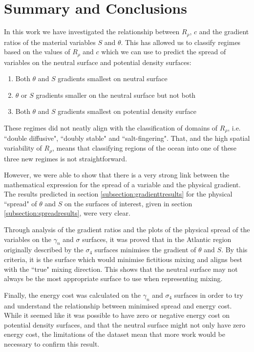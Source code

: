 \label{chapter:Discussion}
\section{Summary and Conclusions}

In this work we have investigated the relationship between $R_\rho$, $c$ and the gradient ratios of the material variables $S$ and $\theta$. This has allowed us to classify regimes based on the values of $R_\rho$ and $c$ which we can use to predict the spread of variables on the neutral surface and potential density surfaces:

\begin{enumerate}
    \item Both $\theta$ and $S$ gradients smallest on neutral surface
    \item $\theta$ or $S$ gradients smaller on the neutral surface but not both
    \item Both $\theta$ and $S$ gradients smallest on potential density surface
\end{enumerate}

These regimes did not neatly align with the classification of domains of $R_\rho$, i.e. ``double diffusive", ``doubly stable" and ``salt-fingering". That, and the high spatial variability of $R_\rho$, means that classifying regions of the ocean into one of these three new regimes is not straightforward.

However, we were able to show that there is a very strong link between the mathematical expression for the spread of a variable and the physical gradient. The results predicted in section \ref{subsection:gradienttresults} for the physical ``spread" of $\theta$ and $S$ on the surfaces of interest, given in section \ref{subsection:spreadresults}, were very clear. 

Through analysis of the gradient ratios and the plots of the physical spread of the variables on the $\gamma_n$ and $\sigma$ surfaces, it was proved that in the Atlantic region originally described by \citet{McDougall1987} the $\sigma_4$ surfaces minimises the gradient of $\theta$ and $S$. By this criteria, it is the surface which would minimise fictitious mixing and aligns best with the ``true" mixing direction. This shows that the neutral surface may not always be the most appropriate surface to use when representing mixing.

Finally, the energy cost was calculated on the $\gamma_n$ and $\sigma_4$ surfaces in order to try and understand the relationship between minimised spread and energy cost. While it seemed like it was possible to have zero or negative energy cost on potential density surfaces, and that the neutral surface might not only have zero energy cost, the limitations of the dataset mean that more work would be necessary to confirm this result. 

